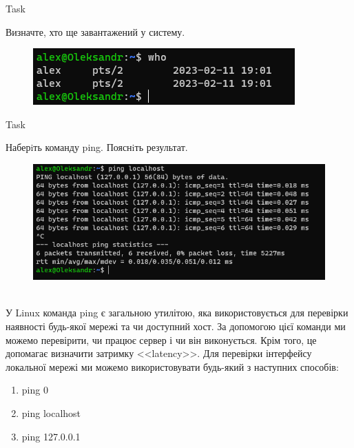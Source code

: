 \documentclass[a4paper,12pt]{article}
\newcommand{\RomanNumeralCaps}[1]{\MakeUppercase{\romannumeral #1}}
\begin{document}
\newpage
    \begin{center}
        \Large{Task \RomanNumeralCaps{8}}
    \end{center}
    Визначте, хто ще завантажений у систему.
    \begin{figure}[h!]
        \begin{minipage}[h]{1\linewidth}
            \centering
            \includegraphics[width=0.5\linewidth]{Prt sc/Figure_8.png}  
        \end{minipage}
    \end{figure}
    
    \begin{center}
        \Large{Task \RomanNumeralCaps{9}}
    \end{center}
    Наберiть команду ping. Пояснiть результат.
    \begin{figure}[h!]
        \begin{minipage}[h]{1\linewidth}
            \centering
            \includegraphics[width=0.8\linewidth]{Prt sc/Figure_9.png}  
        \end{minipage}
    \end{figure} \\
    У Linux команда ping є загальною утилітою, яка використовується для перевірки 
    наявності будь-якої мережі та чи доступний хост. За допомогою цієї команди ми 
    можемо перевірити, чи працює сервер і чи він виконується. Крім того, це допомагає визначити
    затримку <<latency>>.
    Для перевірки інтерфейсу локальної мережі ми можемо використовувати будь-який з наступних способів:
    \begin{enumerate}
        \item ping 0
        \item ping localhost
        \item ping 127.0.0.1
    \end{enumerate}
\end{document}
